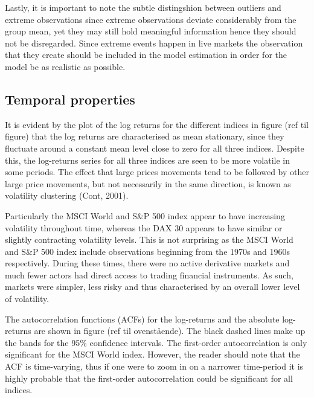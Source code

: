 Lastly, it is important to note the subtle distingshion between outliers and extreme observations since extreme observations deviate considerably from the group mean, yet they may still hold meaningful information hence they should not be disregarded.
Since extreme events happen in live markets the observation that they create should be included in the model estimation in order for the model be as realistic as possible.



\label{subsection: distributional properties}

 
\subsection{Temporal properties}
\label{subsection: temporal properties}
It is evident by the plot of the log returns for the different indices in figure (ref til figure) that the log returns are characterised as mean stationary, since they fluctuate around a constant mean level close to zero for all three indices. Despite this, the log-returns series for all three indices are seen to be more volatile in some periods. The effect that large prices movements tend to be followed by other large price movements, but not necessarily in the same direction, is known as volatility clustering (Cont, 2001). 

Particularly the MSCI World and S\&P 500 index appear to have increasing volatility throughout time, whereas the DAX 30 appears to have similar or slightly contracting volatility levels. This is not surprising as the MSCI World and S\&P 500 index include observations beginning from the 1970s and 1960s respectively. During these times, there were no active derivative markets and much fewer actors had direct access to trading financial instruments. As such, markets were simpler, less risky and thus characterised by an overall lower level of volatility. 


The autocorrelation functions (ACFs) for the log-returns and the absolute log-
returns are shown in figure (ref til ovenstående). The black dashed lines make up the bands for the 95\% confidence intervals. The first-order autocorrelation is only significant for the MSCI World index. However, the reader should note that the ACF is time-varying, thus if one were to zoom in on a narrower time-period it is highly probable that the first-order autocorrelation could be significant for all indices. 


